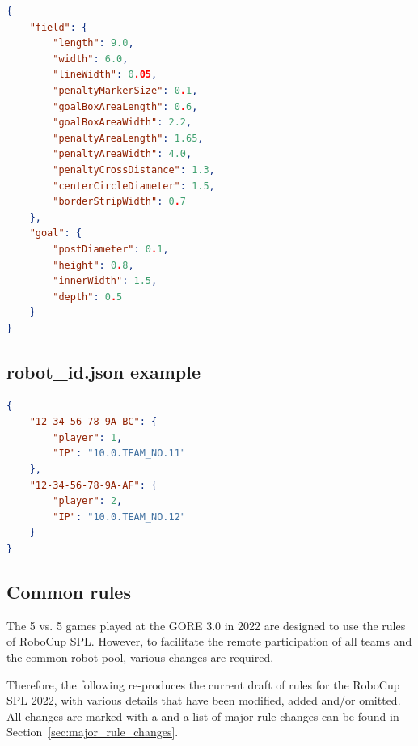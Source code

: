 \begin{lstlisting}[language=json,firstnumber=1]
{
    "field": {
        "length": 9.0,
        "width": 6.0,
        "lineWidth": 0.05,
        "penaltyMarkerSize": 0.1,
        "goalBoxAreaLength": 0.6,
        "goalBoxAreaWidth": 2.2,
        "penaltyAreaLength": 1.65,
        "penaltyAreaWidth": 4.0,
        "penaltyCrossDistance": 1.3,
        "centerCircleDiameter": 1.5,
        "borderStripWidth": 0.7
    },
    "goal": {
        "postDiameter": 0.1,
        "height": 0.8,
        "innerWidth": 1.5,
        "depth": 0.5
    }
}
\end{lstlisting}


\subsection{robot\_id.json example}
\label{sec:robotidjson}

\begin{lstlisting}[language=json,firstnumber=1]
{
    "12-34-56-78-9A-BC": {
        "player": 1,
        "IP": "10.0.TEAM_NO.11"
    },
    "12-34-56-78-9A-AF": {
        "player": 2,
        "IP": "10.0.TEAM_NO.12"
    }
}
\end{lstlisting}

\subsection{Common rules}
\label{sec:Common_rules}
The 5 vs. 5 games played at the GORE 3.0 in 2022 are designed to use the rules of RoboCup SPL. However, to facilitate the remote participation of all teams and the common robot pool, various changes are required.

Therefore, the following re-produces the current draft of rules for the RoboCup SPL 2022, with various details that have been modified, added and/or omitted. All changes are marked with a  and a list of major rule changes can be found in Section~\ref{sec:major_rule_changes}.

